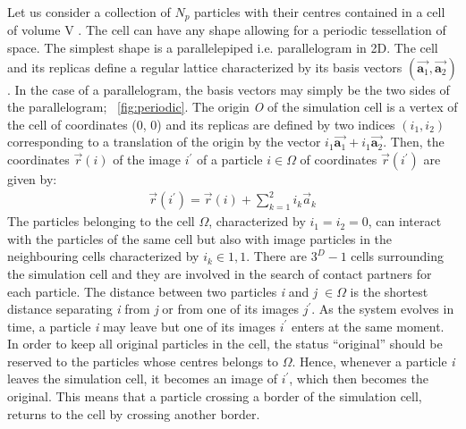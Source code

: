 Let us consider a collection of $N_{p}$ particles with their centres contained 
in a cell of volume 
V . The cell can have any shape allowing for a periodic tessellation of space. 
The simplest shape 
is a parallelepiped i.e. parallelogram in 2D. The cell and its replicas define 
a regular lattice 
characterized by its basis vectors 
$(\overrightarrow{\mathbf{a}_{1}},\overrightarrow{\mathbf{a}_{2}})$. In the 
case of a 
parallelogram, the basis vectors may simply be the two sides of the 
parallelogram; 
~\cref{fig:periodic}. The origin \textit{O} of the simulation cell is a vertex 
of the cell of 
coordinates (0, 0) and its replicas are defined by two indices $(i_{1}, i_{2})$ 
corresponding to a 
translation of the origin by the vector 
$i_{1}\overrightarrow{\mathbf{a}_{1}}+i_{1}\overrightarrow{\mathbf{a}_{2}}$. 
Then, the coordinates 
$\overrightarrow{r}(\mathit{i})$ of the image $\mathit{i}^{\prime}$ of a 
particle $\mathit{i} \in 
\Omega$ of coordinates  $\overrightarrow{r}(\mathit{i}^{\prime})$ are given by:
\begin{align}
\overrightarrow{r}(i^{\prime})=\overrightarrow{r}(i)+\sum\limits_{k=1}^{2}{\mathit{i}_{\mathit{k}}\overrightarrow{\mathbf{\mathit{a}}}_{\mathit{k}}}
\end{align}
The particles belonging to the cell $\Omega$, characterized by $\mathit{i}_{1} 
= \mathit{i}_{2} = 
0$, can interact with the particles of the same cell but also with image 
particles in the 
neighbouring cells characterized by $\mathit{i}_{k}\in {1, 1}$. There are  
$3^{D} - 1$ cells 
surrounding the simulation cell and they are involved in the search of contact 
partners for each 
particle. The distance between two particles \textit{i} and \textit{j} $\in 
\Omega$ is the 
shortest 
distance separating \textit{i} from \textit{j} or from one of its images 
$\mathit{j}^{\prime}$. As 
the system evolves in time, a particle \textit{i} may leave but one of its 
images 
$\mathit{i}^{\prime}$ enters at the same moment. In order to keep all original 
particles in the 
cell, the status ``original'' should be reserved to the particles whose centres 
belongs to 
$\Omega$. Hence, whenever a particle \textit{i} leaves the simulation cell, it 
becomes an image of 
$\mathit{i}^{\prime}$, which then becomes the original. This means that a 
particle crossing a 
border of the simulation cell, returns to the cell by crossing another border.
